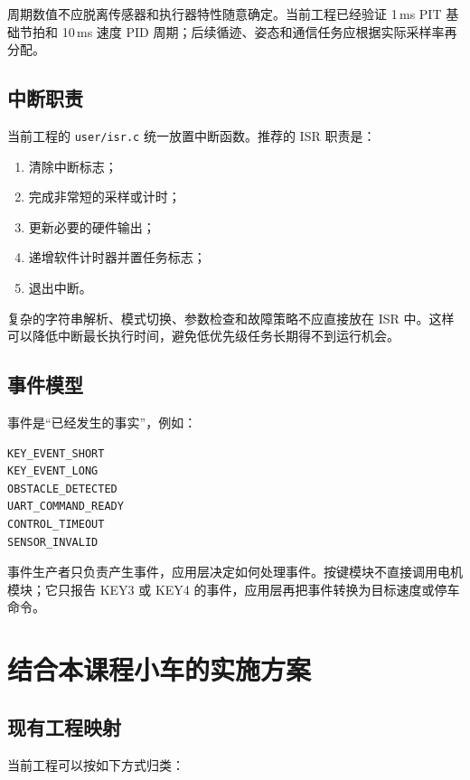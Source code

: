 \documentclass[11pt,a4paper,fontset=fandol]{ctexart}
\begin{document}
周期数值不应脱离传感器和执行器特性随意确定。当前工程已经验证 1\,ms PIT 基础节拍和 10\,ms 速度 PID 周期；后续循迹、姿态和通信任务应根据实际采样率再分配。

\subsection{中断职责}

当前工程的 \texttt{user/isr.c} 统一放置中断函数。推荐的 ISR 职责是：

\begin{enumerate}
\item 清除中断标志；
\item 完成非常短的采样或计时；
\item 更新必要的硬件输出；
\item 递增软件计时器并置任务标志；
\item 退出中断。
\end{enumerate}

复杂的字符串解析、模式切换、参数检查和故障策略不应直接放在 ISR 中。这样可以降低中断最长执行时间，避免低优先级任务长期得不到运行机会。

\subsection{事件模型}

事件是“已经发生的事实”，例如：

\begin{lstlisting}
KEY_EVENT_SHORT
KEY_EVENT_LONG
OBSTACLE_DETECTED
UART_COMMAND_READY
CONTROL_TIMEOUT
SENSOR_INVALID
\end{lstlisting}

事件生产者只负责产生事件，应用层决定如何处理事件。按键模块不直接调用电机模块；它只报告 KEY3 或 KEY4 的事件，应用层再把事件转换为目标速度或停车命令。

\section{结合本课程小车的实施方案}

\subsection{现有工程映射}

当前工程可以按如下方式归类：
\end{document}
